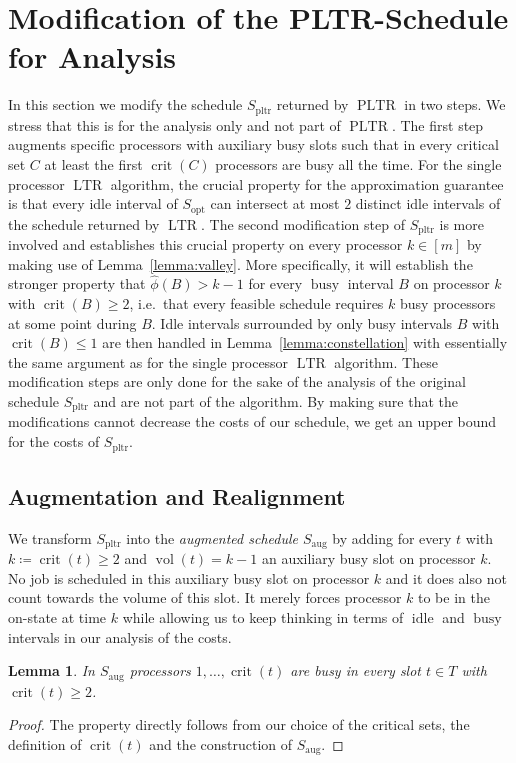 \documentclass[a4paper]{article}
\DeclareMathOperator{\idle}{idle}
\DeclareMathOperator{\busy}{busy}
\DeclareMathOperator{\opt}{opt}
\DeclareMathOperator{\pltr}{pltr}
\DeclareMathOperator{\PLTR}{PLTR}
\DeclareMathOperator{\LTR}{LTR}
\DeclareMathOperator{\aug}{aug}
\DeclareMathOperator{\vol}{vol}
\DeclareMathOperator{\crit}{crit}
\newtheorem{lemma}[theorem]{Lemma}
\begin{document}
\section{Modification of the PLTR-Schedule for Analysis}\label{section:approximation}
In this section we modify the schedule $S_{\pltr}$ returned by $\PLTR$ in two steps.
We stress that this is for the analysis only and not part of $\PLTR$.
The first step augments specific processors with auxiliary busy slots such that in every critical set $C$ at least the first $\crit(C)$ processors are busy all the time.
For the single processor $\LTR$ algorithm, the crucial property for the approximation guarantee is that every idle interval of $S_{\opt}$ can intersect at most $2$ distinct idle intervals of the schedule returned by $\LTR$.
The second modification step of $S_{\pltr}$ is more involved and establishes this crucial property on every processor $k \in [m]$ by making use of Lemma~\ref{lemma:valley}.
More specifically, it will establish the stronger property that $\hat \phi(B) > k - 1$ for every $\busy$ interval $B$ on processor $k$ with $\crit(B) \geq 2$, i.e.\ that every feasible schedule requires $k$ busy processors at some point during $B$.
Idle intervals surrounded by only busy intervals $B$ with $\crit(B) \leq 1$ are then handled in Lemma~\ref{lemma:constellation} with essentially the same argument as for the single processor $\LTR$ algorithm.
These modification steps are only done for the sake of the analysis of the original schedule $S_{\pltr}$ and are not part of the algorithm.
By making sure that the modifications cannot decrease the costs of our schedule, we get an upper bound for the costs of $S_{\pltr}$.

\subsection{Augmentation and Realignment}
We transform $S_{\pltr}$ into the \emph{augmented schedule $S_{\aug}$} by adding for every $t$ with $k \coloneqq \crit(t) \geq 2$ and $\vol(t) = k-1$ an auxiliary busy slot on processor $k$.
No job is scheduled in this auxiliary busy slot on processor $k$ and it does also not count towards the volume of this slot.
It merely forces processor $k$ to be in the on-state at time $k$ while allowing us to keep thinking in terms of $\idle$ and $\busy$ intervals in our analysis of the costs.

\begin{lemma}\label{lemma:augmented}
  In $S_{\aug}$ processors $1, \ldots, \crit(t)$ are busy in every slot $t \in T$ with $\crit(t) \geq 2$.
\end{lemma}
\begin{proof}
  The property directly follows from our choice of the critical sets, the definition of $\crit(t)$ and the construction of $S_{\aug}$.
\end{proof}
\end{document}
